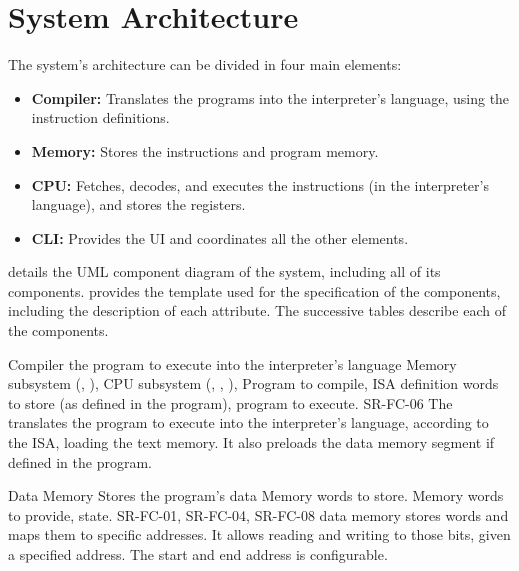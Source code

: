 \section{System Architecture}\label{sec:architecture}
The system's architecture can be divided in four main elements:
\begin{itemize}
  \item \textbf{Compiler:} Translates the  programs into the \gls{interpreter}'s language, using the \gls{instruction} definitions.
  \item \textbf{Memory:} Stores the \glspl{instruction} and program memory.
  \item \textbf{\gls{CPU}:} Fetches, decodes, and executes the \glspl{instruction} (in the interpreter's language), and stores the \glspl{register}.
  \item \textbf{\gls{CLI}:} Provides the \gls{UI} and coordinates all the other elements.
\end{itemize}

 details the UML component diagram \parencite{Cook2017} of the system, including all of its components.  provides the template used for the specification of the components, including the description of each attribute. The successive tables describe each of the components.




\begin{component}{Compiler}
  { the program to execute into the interpreter's language}  %
  {Memory subsystem (, ), CPU subsystem (, , ), }  %
  {Program to compile, \gls{ISA} definition}  %
  { words to store (as defined in the program), program to execute.}  %
  {SR-FC-06}  %
  The  translates the  program to execute into the interpreter's language, according to the \gls{ISA}, loading the \gls{text memory}. It also preloads the \gls{data memory} segment if defined in the program.
\end{component}

\begin{component}{Data Memory}
  {Stores the program's data}  %
  {\NA}  %
  {Memory \glspl{word} to store.}  %
  {Memory \glspl{word} to provide, state.}  %
  {SR-FC-01, SR-FC-04, SR-FC-08}  %
  \Gls{data memory} stores \glspl{word} and maps them to specific addresses. It allows reading and writing to those bits, given a specified address. The start and end address is configurable.
\end{component}

